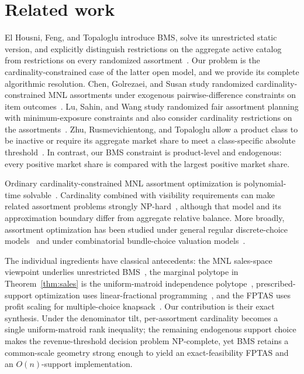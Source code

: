 \documentclass[11pt]{article}
\begin{document}
\section{Related work}\label{sec:related}

El Housni, Feng, and Topaloglu introduce BMS, solve its unrestricted static version, and explicitly distinguish restrictions on the aggregate active catalog from restrictions on every randomized assortment~\cite{EFTopaloglu}.  Our problem is the cardinality-constrained case of the latter open model, and we provide its complete algorithmic resolution.  Chen, Golrezaei, and Susan study randomized cardinality-constrained MNL assortments under exogenous pairwise-difference constraints on item outcomes~\cite{ChenGolrezaeiSusan}.  Lu, Sahin, and Wang study randomized fair assortment planning with minimum-exposure constraints and also consider cardinality restrictions on the assortments~\cite{LuSahinWang}.  Zhu, Rusmevichientong, and Topaloglu allow a product class to be inactive or require its aggregate market share to meet a class-specific absolute threshold~\cite{ZhuRusTop}.  In contrast, our BMS constraint is product-level and endogenous: every positive market share is compared with the largest positive market share.

Ordinary cardinality-constrained MNL assortment optimization is polynomial-time solvable~\cite{RusShenShmoys}.  Cardinality combined with visibility requirements can make related assortment problems strongly NP-hard~\cite{BarreEtAl}, although that model and its approximation boundary differ from aggregate relative balance.  More broadly, assortment optimization has been studied under general regular discrete-choice models~\cite{BerbegliaJoret} and under combinatorial bundle-choice valuation models~\cite{ImmorlicaEtAl}.

The individual ingredients have classical antecedents: the MNL sales-space viewpoint underlies unrestricted BMS~\cite{EFTopaloglu}, the marginal polytope in Theorem~\ref{thm:sales} is the uniform-matroid independence polytope~\cite{Schrijver}, prescribed-support optimization uses linear-fractional programming~\cite{CharnesCooper}, and the FPTAS uses profit scaling for multiple-choice knapsack~\cite{KellererEtAl}.  Our contribution is their exact synthesis. Under the denominator tilt, per-assortment cardinality becomes a single uniform-matroid rank inequality; the remaining endogenous support choice makes the revenue-threshold decision problem NP-complete, yet BMS retains a common-scale geometry strong enough to yield an exact-feasibility FPTAS and an $O(n)$-support implementation.
\end{document}

